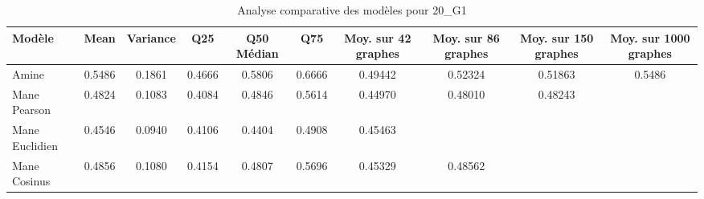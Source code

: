 \begin{table}[h]
\centering
\begin{tabular}{|l|c|c|c|c|c|c|c|c|c|}
\hline
\textbf{Modèle} & \textbf{Mean} & \textbf{Variance} & \textbf{Q25} & \textbf{Q50 Médian} & \textbf{Q75} & \textbf{Moy. sur 42 graphes} & \textbf{Moy. sur 86 graphes} & \textbf{Moy. sur 150 graphes} & \textbf{Moy. sur 1000 graphes} \\ \hline
Amine           & 0.5486        & 0.1861            & 0.4666       & 0.5806              & 0.6666       & 0.49442                      & 0.52324                       & 0.51863                        & 0.5486                         \\ \hline
Mane Pearson    & 0.4824        & 0.1083            & 0.4084       & 0.4846              & 0.5614       & 0.44970                      & 0.48010                       & 0.48243                        &                                \\ \hline
Mane Euclidien  & 0.4546        & 0.0940            & 0.4106       & 0.4404              & 0.4908       & 0.45463                      &                               &                                &                                \\ \hline
Mane Cosinus    & 0.4856        & 0.1080            & 0.4154       & 0.4807              & 0.5696       & 0.45329                      & 0.48562                       &                                &                                \\ \hline
\end{tabular}
\caption{Analyse comparative des modèles pour 20\_G1}
\label{tab:modele_20_G1_comparaison}
\end{table}

